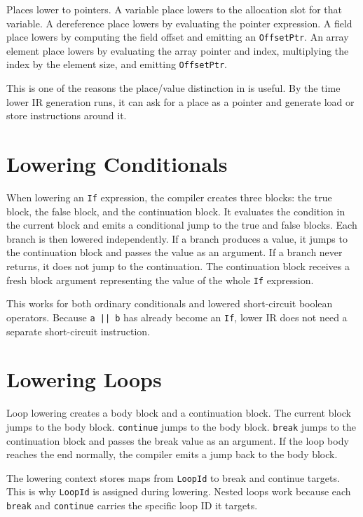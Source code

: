 Places lower to pointers. A variable place lowers to the allocation slot for
that variable. A dereference place lowers by evaluating the pointer expression.
A field place lowers by computing the field offset and emitting an
\texttt{OffsetPtr}. An array element place lowers by evaluating the array pointer
and index, multiplying the index by the element size, and emitting
\texttt{OffsetPtr}.

This is one of the reasons the place/value distinction in \irtree{} is useful.
By the time lower IR generation runs, it can ask for a place as a pointer and
generate load or store instructions around it.

\section{Lowering Conditionals}

When lowering an \texttt{If} expression, the compiler creates three blocks: the
true block, the false block, and the continuation block. It evaluates the
condition in the current block and emits a conditional jump to the true and false
blocks. Each branch is then lowered independently. If a branch produces a value,
it jumps to the continuation block and passes the value as an argument. If a
branch never returns, it does not jump to the continuation. The continuation
block receives a fresh block argument representing the value of the whole
\texttt{If} expression.

This works for both ordinary conditionals and lowered short-circuit boolean
operators. Because \texttt{a || b} has already become an \texttt{If}, lower IR
does not need a separate short-circuit instruction.

\section{Lowering Loops}

Loop lowering creates a body block and a continuation block. The current block
jumps to the body block. \texttt{continue} jumps to the body block. \texttt{break}
jumps to the continuation block and passes the break value as an argument. If
the loop body reaches the end normally, the compiler emits a jump back to the
body block.

The lowering context stores maps from \texttt{LoopId} to break and continue
targets. This is why \texttt{LoopId} is assigned during \irtree{} lowering.
Nested loops work because each \texttt{break} and \texttt{continue} carries the
specific loop ID it targets.

